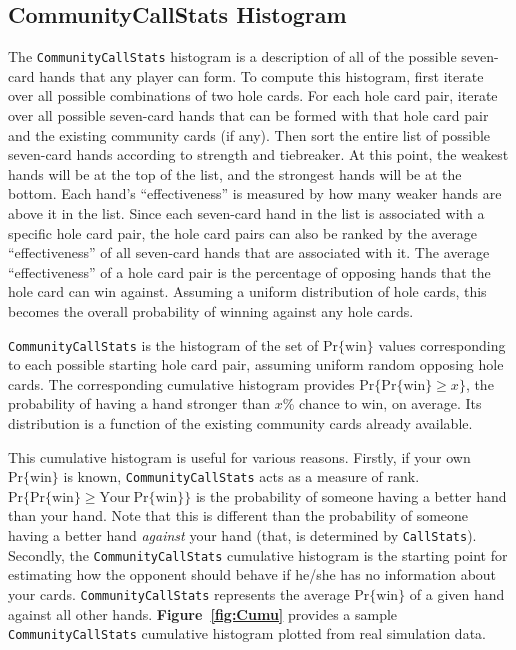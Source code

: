 \subsection{CommunityCallStats Histogram}
\label{sec:CommunityCallStats}

The \texttt{CommunityCallStats} histogram is a description of all of the possible seven-card hands that any player can form.
To compute this histogram, first iterate over all possible combinations of two hole cards.
For each hole card pair, iterate over all possible seven-card hands that can be formed with that hole card pair and the existing community cards (if any).
Then sort the entire list of possible seven-card hands according to strength and tiebreaker.
At this point, the weakest hands will be at the top of the list, and the strongest hands will be at the bottom.
Each hand's ``effectiveness'' is measured by how many weaker hands are above it in the list.
Since each seven-card hand in the list is associated with a specific hole card pair, the hole card pairs can also be ranked by the average ``effectiveness'' of all seven-card hands that are associated with it.
The average ``effectiveness'' of a hole card pair is the percentage of opposing hands that the hole card can win against.
Assuming a uniform distribution of hole cards, this becomes the overall probability of winning against any hole cards.

\texttt{CommunityCallStats} is the histogram of the set of $\mathrm{Pr\{win\}}$ values corresponding to each possible starting hole card pair, assuming uniform random opposing hole cards.
The corresponding cumulative histogram provides $\mathrm{Pr}\{\mathrm{Pr\{win\}} \ge x\}$, the probability of having a hand stronger than $x$\% chance to win, on average.
Its distribution is a function of the existing community cards already available.

This cumulative histogram is useful for various reasons.
Firstly, if your own $\mathrm{Pr\{win\}}$ is known, \texttt{CommunityCallStats} acts as a measure of rank.
$\mathrm{Pr}\{\mathrm{Pr\{win\}} \ge \mathrm{Your\:Pr\{win\}}\}$ is the probability of someone having a better hand than your hand.
Note that this is different than the probability of someone having a better hand \emph{against} your hand (that, is determined by \texttt{CallStats}).
Secondly, the \texttt{CommunityCallStats} cumulative histogram is the starting point for estimating how the opponent should behave if he/she has no information about your cards.
\texttt{CommunityCallStats} represents the average $\mathrm{Pr\{win\}}$ of a given hand against all other hands.
\textbf{Figure~\ref{fig:Cumu}} provides a sample \texttt{CommunityCallStats} cumulative histogram plotted from real simulation data.


